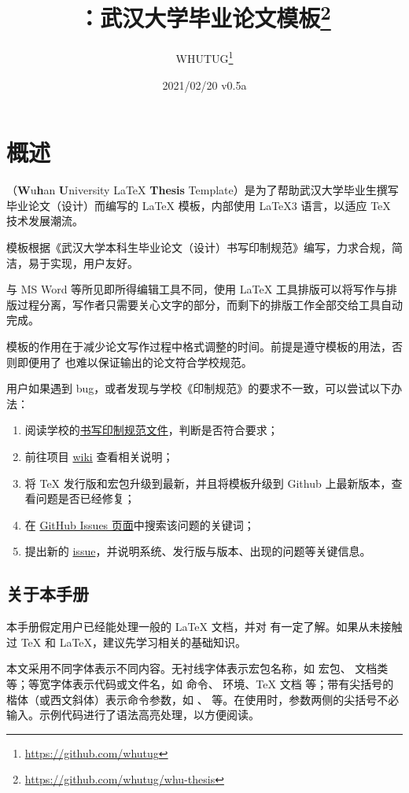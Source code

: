 \documentclass{fdudoc}
\title{\cls{whu-thesis}\bfseries ：武汉大学毕业论文模板\thanks{\url{https://github.com/whutug/whu-thesis}}}
\author{WHUTUG\thanks{\url{https://github.com/whutug}}}
\date{2021/02/20 \quad v0.5a}
\begin{document}
\maketitle
\tableofcontents

\section{概述}
（\textbf{W}u\textbf{h}an \textbf{U}niversity \LaTeX{} \textbf{Thesis} Template）是为了帮助武汉大学毕业生撰写毕业论文（设计）而编写的 \LaTeX{} 模板，内部使用 \LaTeX3 语言，以适应 \TeX{} 技术发展潮流。

模板根据《武汉大学本科生毕业论文（设计）书写印制规范》编写，力求合规，简洁，易于实现，用户友好。

与 MS Word 等所见即所得编辑工具不同，使用 \LaTeX{} 工具排版可以将写作与排版过程分离，写作者只需要关心文字的部分，而剩下的排版工作全部交给工具自动完成。

模板的作用在于减少论文写作过程中格式调整的时间。前提是遵守模板的用法，否则即便用了  也难以保证输出的论文符合学校规范。

用户如果遇到 bug，或者发现与学校《印制规范》的要求不一致，可以尝试以下办法：
\begin{enumerate}
    \item 阅读学校的\href{https://github.com/mtobeiyf/whu-thesis/files/4638713/default.pdf}{书写印制规范文件}，判断是否符合要求；
    \item 前往项目 \href{https://github.com/mtobeiyf/whu-thesis/wiki}{wiki} 查看相关说明；
    \item 将 \TeX{} 发行版和宏包升级到最新，并且将模板升级到 Github 上最新版本，查看问题是否已经修复；
    \item 在 \href{https://github.com/mtobeiyf/whu-thesis/issues}{GitHub Issues 页面}中搜索该问题的关键词；
    \item 提出新的 \href{https://github.com/mtobeiyf/whu-thesis/issues}{issue}，并说明系统、发行版与版本、出现的问题等关键信息。
\end{enumerate}

\subsection*{关于本手册}
本手册假定用户已经能处理一般的 \LaTeX{} 文档，并对 \BibTeX{} 有一定了解。如果从未接触过 \TeX{} 和 \LaTeX{}，建议先学习相关的基础知识。

本文采用不同字体表示不同内容。无衬线字体表示宏包名称，如  宏包、 文档类等；等宽字体表示代码或文件名，如  命令、 环境、\TeX{} 文档  等；带有尖括号的楷体（或西文斜体）表示命令参数，如 、 等。在使用时，参数两侧的尖括号不必输入。示例代码进行了语法高亮处理，以方便阅读。
\end{document}
